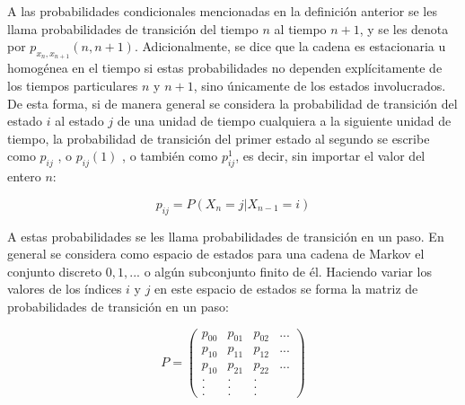 A las probabilidades condicionales mencionadas en la definición anterior se les
llama probabilidades de transición del tiempo $n$ al tiempo $n+1$, y se les
denota por $p_{x_n, x_{n+1}}(n, n +1)$. Adicionalmente, se dice que la cadena es
estacionaria u homogénea en el tiempo si estas probabilidades no dependen
explícitamente de los tiempos particulares $n$ y $n+1$, sino únicamente de los
estados involucrados. De esta forma, si de manera general se considera la
probabilidad de transición del estado $i$ al estado $j$ de una unidad de tiempo
cualquiera a la siguiente unidad de tiempo, la probabilidad de transición del
primer estado al segundo se escribe como $p_{ij}$ , o $p_{ij}(1)$ , o también
como $p_{ij}^{1}$, es decir, sin importar el valor del entero $n$:

\begin{equation}
    p_{ij} = P(X_n = j | X_{n-1} = i)
\end{equation}

A estas probabilidades se les llama probabilidades de transición en un paso. En
general se considera como espacio de estados para una cadena de Markov el
conjunto discreto $0, 1, ...$ o algún subconjunto finito de él. Haciendo variar
los valores de los índices $i$ y $j$ en este espacio de estados se forma la
matriz de probabilidades de transición en un paso:

\begin{equation}
    P = \begin{pmatrix}
        p_{00}  & p_{01}    & p_{02}    & ... \\
        p_{10}  & p_{11}    & p_{12}    & ... \\
        p_{10}  & p_{21}    & p_{22}    & ... \\
        .       & .         & .         &     \\
        .       & .         & .         &     \\
        .       & .         & .         &
    \end{pmatrix}
\end{equation}

